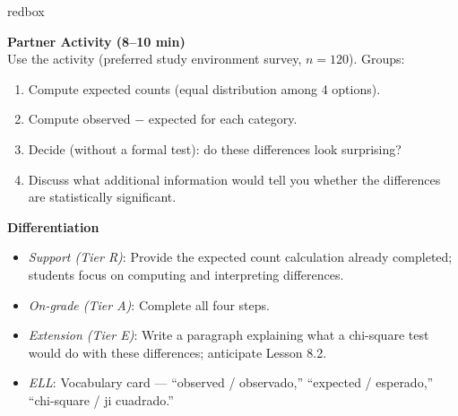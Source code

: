 \documentclass[10pt]{article}
\begin{document}
\begin{skillbox}{redbox}
\begin{minipage}[t]{0.48\linewidth}
    \textbf{Partner Activity (8--10 min)}\\
    Use the activity (preferred study environment survey, $n = 120$). Groups:
    \begin{enumerate}
        \item Compute expected counts (equal distribution among 4 options).
        \item Compute observed $-$ expected for each category.
        \item Decide (without a formal test): do these differences look surprising?
        \item Discuss what additional information would tell you whether the
              differences are statistically significant.
    \end{enumerate}
\end{minipage}
\hfill
\begin{minipage}[t]{0.48\linewidth}
    \textbf{Differentiation}
    \begin{itemize}
        \item \textit{Support (Tier R)}: Provide the expected count calculation
              already completed; students focus on computing and interpreting
              differences.
        \item \textit{On-grade (Tier A)}: Complete all four steps.
        \item \textit{Extension (Tier E)}: Write a paragraph explaining what a
              chi-square test would do with these differences; anticipate Lesson 8.2.
        \item \textit{ELL}: Vocabulary card --- ``observed / observado,''
              ``expected / esperado,'' ``chi-square / ji cuadrado.''
    \end{itemize}
\end{minipage}
\end{skillbox}
\end{document}
